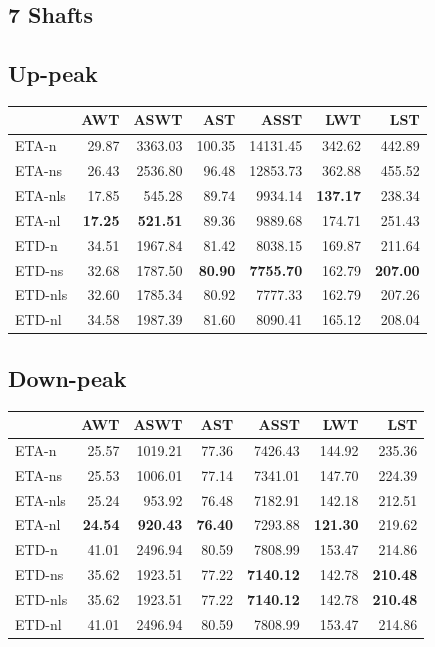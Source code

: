 \documentclass{UoYCSproject}
\begin{document}
\begin{appendices}
\section{7 Shafts}

\subsection{Up-peak}
\begin{tabular}{l | r r r r r r}
	& AWT & ASWT & AST & ASST & LWT & LST \\
	\hline
    ETA-n & 29.87 & 3363.03 & 100.35 & 14131.45 & 342.62 & 442.89 \\
    ETA-ns & 26.43 & 2536.80 & 96.48 & 12853.73 & 362.88 & 455.52 \\
    ETA-nls & 17.85 & 545.28 & 89.74 & 9934.14 & \textbf{137.17} & 238.34 \\
    ETA-nl & \textbf{17.25} & \textbf{521.51} & 89.36 & 9889.68 & 174.71 & 251.43 \\
    ETD-n & 34.51 & 1967.84 & 81.42 & 8038.15 & 169.87 & 211.64 \\
    ETD-ns & 32.68 & 1787.50 & \textbf{80.90} & \textbf{7755.70} & 162.79 & \textbf{207.00} \\
    ETD-nls & 32.60 & 1785.34 & 80.92 & 7777.33 & 162.79 & 207.26 \\
    ETD-nl & 34.58 & 1987.39 & 81.60 & 8090.41 & 165.12 & 208.04
\end{tabular}

\subsection{Down-peak}
\begin{tabular}{l | r r r r r r}
	& AWT & ASWT & AST & ASST & LWT & LST \\
	\hline
    ETA-n & 25.57 & 1019.21 & 77.36 & 7426.43 & 144.92 & 235.36 \\
    ETA-ns & 25.53 & 1006.01 & 77.14 & 7341.01 & 147.70 & 224.39 \\
    ETA-nls & 25.24 & 953.92 & 76.48 & 7182.91 & 142.18 & 212.51 \\
    ETA-nl & \textbf{24.54} & \textbf{920.43} & \textbf{76.40} & 7293.88 & \textbf{121.30} & 219.62 \\
    ETD-n & 41.01 & 2496.94 & 80.59 & 7808.99 & 153.47 & 214.86 \\
    ETD-ns & 35.62 & 1923.51 & 77.22 & \textbf{7140.12} & 142.78 & \textbf{210.48} \\
    ETD-nls & 35.62 & 1923.51 & 77.22 & \textbf{7140.12} & 142.78 & \textbf{210.48} \\
    ETD-nl & 41.01 & 2496.94 & 80.59 & 7808.99 & 153.47 & 214.86
\end{tabular}


\end{appendices}
\end{document}
